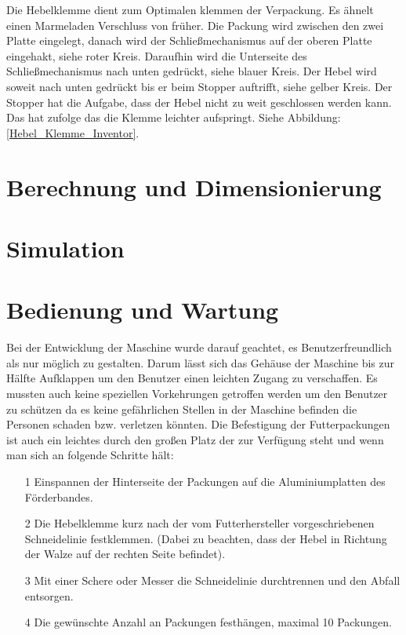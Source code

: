 Die Hebelklemme dient zum Optimalen klemmen der Verpackung.
Es ähnelt einen Marmeladen Verschluss von früher. Die Packung wird zwischen den zwei Platte eingelegt, danach wird der Schließmechanismus auf der oberen Platte eingehakt, siehe roter Kreis. Daraufhin wird die Unterseite des Schließmechanismus nach unten gedrückt, siehe blauer Kreis.
Der Hebel wird soweit nach unten gedrückt bis er beim Stopper auftrifft, siehe gelber Kreis. Der Stopper hat die Aufgabe, dass der Hebel nicht zu weit geschlossen werden kann. Das hat zufolge das die Klemme leichter aufspringt. Siehe Abbildung: \ref{Hebel_Klemme_Inventor}.

\section{Berechnung und Dimensionierung}
\section{Simulation}	
\section{Bedienung und Wartung}

Bei der Entwicklung der Maschine wurde darauf geachtet, es Benutzerfreundlich als nur möglich zu gestalten. Darum lässt sich das Gehäuse der Maschine bis zur Hälfte Aufklappen um den Benutzer einen leichten Zugang zu verschaffen. Es mussten auch keine speziellen Vorkehrungen getroffen werden um den Benutzer zu schützen da es keine gefährlichen Stellen in der Maschine befinden die Personen schaden bzw. verletzen könnten. Die Befestigung der Futterpackungen ist auch ein leichtes durch den großen Platz der zur Verfügung steht und wenn man sich an folgende Schritte hält: 

\begin{itemize}
\item[1] Einspannen der Hinterseite der Packungen auf die Aluminiumplatten des Förderbandes. 
\item[2] Die Hebelklemme kurz nach der vom Futterhersteller vorgeschriebenen Schneidelinie festklemmen. (Dabei zu beachten, dass der Hebel in Richtung der Walze auf der rechten Seite befindet).
\item[3] Mit einer Schere oder Messer die Schneidelinie durchtrennen und den Abfall entsorgen.
\item[4] Die gewünschte Anzahl an Packungen festhängen, maximal 10 Packungen.
\end{itemize} 

